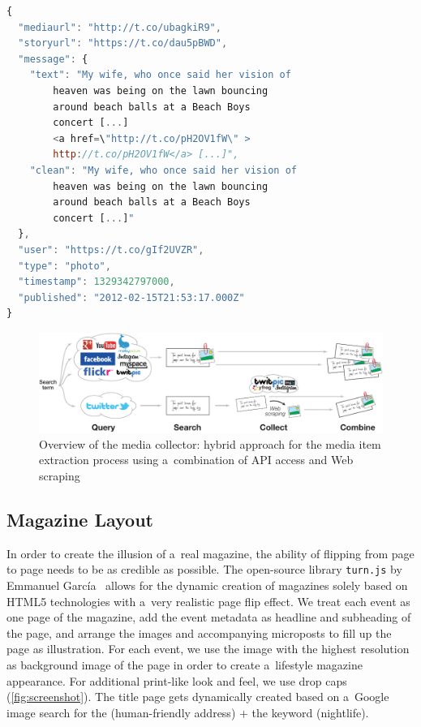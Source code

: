 \documentclass[runningheads,a4paper]{llncs}
\begin{document}
{\begin{lstlisting}[language=JavaScript,caption={Sample output of the media collector showing a~\mbox{Google+} post (edited for legibility, URLs shortened).},label={lst:media}]
{
  "mediaurl": "http://t.co/ubagkiR9",
  "storyurl": "https://t.co/dau5pBWD",
  "message": {
    "text": "My wife, who once said her vision of
        heaven was being on the lawn bouncing
        around beach balls at a Beach Boys
        concert [...]
        <a href=\"http://t.co/pH2OV1fW\" >
        http://t.co/pH2OV1fW</a> [...]",
    "clean": "My wife, who once said her vision of
        heaven was being on the lawn bouncing
        around beach balls at a Beach Boys
        concert [...]"
  },
  "user": "https://t.co/gIf2UVZR",
  "type": "photo",
  "timestamp": 1329342797000,
  "published": "2012-02-15T21:53:17.000Z"
}
\end{lstlisting}

\begin{figure}[htb!]
\centering
\includegraphics[width=0.8\linewidth]{./architecture.pdf}
\caption{Overview of the media collector: hybrid approach for the media item extraction process using a~combination of API access and Web scraping}
\label{fig:architecture}
\end{figure}

\subsection{Magazine Layout}
In order to create the illusion of a~real magazine, the ability of flipping from page to page needs to be as credible as possible. The open-source library \texttt{turn.js} by Emmanuel García~\cite{TurnJs2012} allows for the dynamic creation of magazines solely based on HTML5 technologies with a~very realistic page flip effect. We treat each event as one page of the magazine, add the event metadata as headline and subheading of the page, and arrange the images and accompanying microposts to fill up the page as illustration. For each event, we use the image with the highest resolution as background image of the page in order to create a~lifestyle magazine appearance. For additional print-like look and feel, we use drop caps (\autoref{fig:screenshot}). The title page gets dynamically created based on a~Google image search for the (human-friendly address) $+$ the keyword (nightlife).

}
\end{document}
